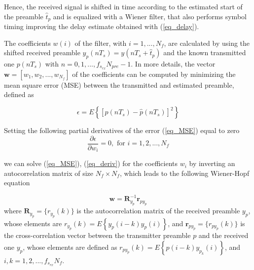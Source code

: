 Hence, the received signal is shifted in time according to the estimated start of the preamble $\hat{t}_{p}$ and is equalized with a Wiener filter, that also performs symbol timing improving the delay estimate obtained with (\ref{eq_delay}). 

The coefficients $w(i)$ of the filter, with $i=1,...,N_f$, are calculated by using the shifted received preamble $y_p(nT_s)=y(nT_s+\hat{t}_{p})$ and the known transmitted one $p(nT_s)$ with $n=0,1,...,f_{s_{rx}}N_{pre}-1$.
In more details, the vector $\mathbf{w}=\left[w_1,w_2,...,w_{N_f}\right]$ of the coefficients can be computed by minimizing the mean square error (MSE) between the transmitted and estimated preamble, defined as  

\begin{equation}
\label{eq_MSE}
\epsilon=E\left\{\left[p(nT_s)-\hat{p}(nT_s)\right]^2\right\}
\end{equation}

Setting the following partial derivatives of the error (\ref{eq_MSE}) equal to zero
\begin{equation}
\label{eq_deriv}
\frac{\partial \epsilon}{\partial w_i}=0, \text{  for }i=1,2,...,N_f
\end{equation}

we can solve (\ref{eq_MSE}), (\ref{eq_deriv}) for the coefficients $w_i$ by inverting an autocorrelation matrix of size $N_f\times N_f$, which leads to the following Wiener-Hopf equation

\begin{equation}
\label{eq_Wiener}
\mathbf{w}=\mathbf{R}_{y_p}^{-1}\mathbf{r}_{py_p}
\end{equation}
where $\mathbf{R}_{y_p}=\{r_{y_p}(k)\}$ is the autocorrelation matrix of the received preamble $y_p$, whose elements are $r_{y_p}(k)=E\left\{y_{p}(i-k)y_{p}(i)\right\} $, and $\mathbf{r}_{py_p}=\{r_{py_p}(k)\}$ is the cross-correlation vector between the transmitter preamble $p$ and the received one $y_p$, whose elements are defined as $r_{py_p}(k)=E\left\{p(i-k)y_{p_k}(i)\right\}$, and $i,k=1,2,...,f_{s_{rx}}N_f$.

